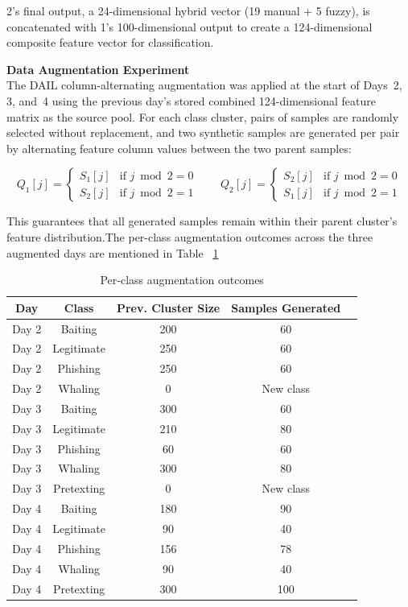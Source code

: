 2's final output, a 24-dimensional hybrid vector (19 manual + 5 fuzzy), is concatenated with 1's 100-dimensional output to create a 124-dimensional composite feature vector for classification.

\textbf{Data Augmentation Experiment}\\
The DAIL column-alternating augmentation was applied at the start of Days~2, 3, and~4 using the previous day's stored combined 124-dimensional feature matrix as the source pool. For each class cluster, pairs of samples are randomly selected without replacement, and two synthetic samples are generated per pair by alternating feature column values between the two parent samples:

\[
Q_1[j] =
\begin{cases}
S_1[j] & \text{if } j \bmod 2 = 0 \\
S_2[j] & \text{if } j \bmod 2 = 1
\end{cases}
\qquad
Q_2[j] =
\begin{cases}
S_2[j] & \text{if } j \bmod 2 = 0 \\
S_1[j] & \text{if } j \bmod 2 = 1
\end{cases}
\]

This guarantees that all generated samples remain within their parent cluster's feature distribution.The per-class augmentation outcomes across the three augmented days are mentioned in Table ~\ref{tab:per-class-aug}

\begin{table}[h]
\centering
\caption{Per-class augmentation outcomes}
\label{tab:per-class-aug}
\begin{tabular}{|c|c|c|c|p{4.5cm}|}
\hline
\textbf{Day} & \textbf{Class} & \textbf{Prev. Cluster Size} & \textbf{Samples Generated}  \\
\hline
Day 2 & Baiting & 200 & 60 \\
Day 2 & Legitimate & 250 & 60 \\
Day 2 & Phishing & 250 & 60 \\
Day 2 & Whaling & 0 & New class \\

\hline
Day 3 & Baiting & 300 & 60  \\
Day 3 & Legitimate & 210 & 80 \\
Day 3 & Phishing & 60 & 60 \\
Day 3 & Whaling & 300 & 80 \\
Day 3 & Pretexting & 0 & New class\\


\hline
Day 4 & Baiting & 180 & 90 \\
Day 4 & Legitimate & 90 & 40  \\
Day 4 & Phishing & 156 & 78 \\
Day 4 & Whaling & 90 & 40 \\
Day 4 & Pretexting & 300 & 100\\
\hline
\end{tabular}
\end{table}
